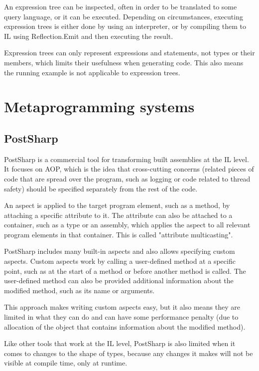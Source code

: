 An expression tree can be inspected, often in order to be translated to some query language, or it can be executed. Depending on circumstances, executing expression trees is either done by using an interpreter, or by compiling them to \ac{IL} using Reflection.Emit and then executing the result.

Expression trees can only represent expressions and statements, not types or their members, which limits their usefulness when generating code. This also means the running example is not applicable to expression trees.

\section{Metaprogramming systems}
\label{metaprogramming}


\subsection{PostSharp}

PostSharp \cite{postsharp} is a commercial tool for transforming built assemblies at the \ac{IL} level. It focuses on \ac{AOP}, which is the idea that cross-cutting concerns (related pieces of code that are spread over the program, such as logging or code related to thread safety) should be specified separately from the rest of the code.

An aspect is applied to the target program element, such as a method, by attaching a specific attribute to it. The attribute can also be attached to a container, such as a type or an assembly, which applies the aspect to all relevant program elements in that container. This is called "attribute multicasting".

PostSharp includes many built-in aspects and also allows specifying custom aspects. Custom aspects work by calling a user-defined method at a specific point, such as at the start of a method or before another method is called. The user-defined method can also be provided additional information about the modified method, such as its name or arguments.

This approach makes writing custom aspects easy, but it also means they are limited in what they can do and can have some performance penalty (due to allocation of the object that contains information about the modified method).

Like other tools that work at the \ac{IL} level, PostSharp is also limited when it comes to changes to the shape of types, because any changes it makes will not be visible at compile time, only at runtime.

